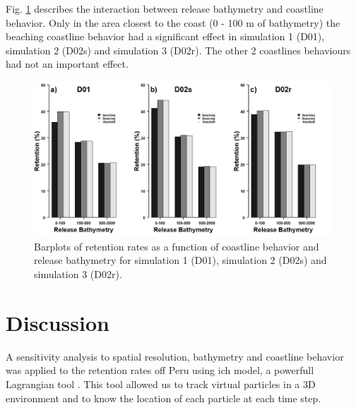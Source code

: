 Fig. \ref{Chap2CoastlineBehavior} describes the interaction between release bathymetry and coastline behavior. Only in the area closest to the coast (0 - 100 m of bathymetry) the beaching coastline behavior had a significant effect in simulation 1 (D01), simulation 2 (D02s) and simulation 3 (D02r). The other 2 coastlines behaviours had not an important effect.\\

\begin{figure}[ht]
	\includegraphics[width=1.0\textwidth]{figures/Chap2CoastlineBehavior.png}
	\centering
	\caption{Barplots of retention rates as a function of coastline behavior and release bathymetry for simulation 1 (D01), simulation 2 (D02s) and simulation 3 (D02r).}
	\label{Chap2CoastlineBehavior}
\end{figure}

\clearpage

\section{Discussion}\label{Chap2Disc}

A sensitivity analysis to spatial resolution, bathymetry and coastline behavior was applied to the retention rates off Peru using \gls{ich} model, a powerfull Lagrangian tool \citep{LettVerl2008}. This tool allowed us to track virtual particles in a 3D environment and to know the location of each particle at each time step.\\

